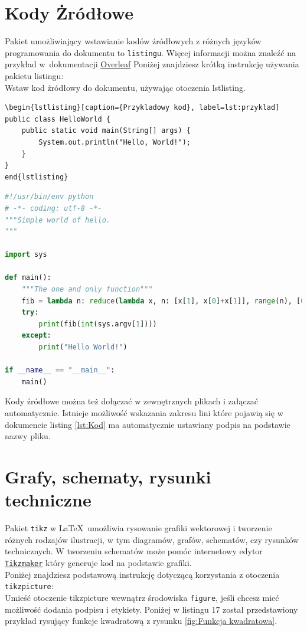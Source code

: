 \clearpage
\section{Kody Żródłowe}
Pakiet umożliwiający wstawianie kodów źródłowych z różnych języków programowania do dokumentu to \texttt{listingu}. Więcej informacji można znaleźć na przykład w~dokumentacji \href{https://www.overleaf.com/learn/latex/code_listing}{Overleaf} Poniżej znajdziesz krótką instrukcję używania pakietu listingu:\\

Wstaw kod źródłowy do dokumentu, używając otoczenia lstlisting.
\begin{lstlisting}[caption={Przykladowy kod}, label=lst:przyklad]
\begin{lstlisting}[caption={Przykladowy kod}, label=lst:przyklad]
public class HelloWorld {
    public static void main(String[] args) {
        System.out.println("Hello, World!");
    }
}
end{lstlisting}
\end{lstlisting}

\begin{lstlisting}[language=Python,
    caption={Prosty program w~języku python},
    label={lst:hellopy}]
#!/usr/bin/env python
# -*- coding: utf-8 -*-
"""Simple world of hello.
"""

import sys

def main():
    """The one and only function"""
    fib = lambda n: reduce(lambda x, n: [x[1], x[0]+x[1]], range(n), [0, 1])[0]
    try:
        print(fib(int(sys.argv[1])))
    except:
        print("Hello World!")

if __name__ == "__main__":
    main()
\end{lstlisting}
Kody źródłowe można też dołączać w zewnętrznych plikach i załączać automatycznie.
Istnieje możliwość wskazania zakresu lini które pojawią się w dokumencie listing \ref{lst:Kod} ma automatycznie ustawiany podpis na podstawie nazwy pliku.




\section{Grafy, schematy, rysunki techniczne}

Pakiet \texttt{tikz} w \LaTeX\ umożliwia rysowanie grafiki wektorowej i tworzenie różnych rodzajów ilustracji, w tym diagramów, grafów, schematów, czy rysunków technicznych.
W tworzeniu schematów może pomóc internetowy edytor \href{https://tikzmaker.com}{\texttt{Tikzmaker}} który generuje kod na podstawie grafiki. \\
Poniżej znajdziesz podstawową instrukcję dotyczącą korzystania z otoczenia \texttt{tikzpicture}:\\
Umieść otoczenie tikzpicture wewnątrz środowiska \texttt{figure}, jeśli chcesz mieć możliwość dodania podpisu i etykiety. Poniżej w listingu 17 został przedstawiony przykład rysujący funkcje kwadratową z rysunku \ref{fig:Funkcja kwadratowa}.

